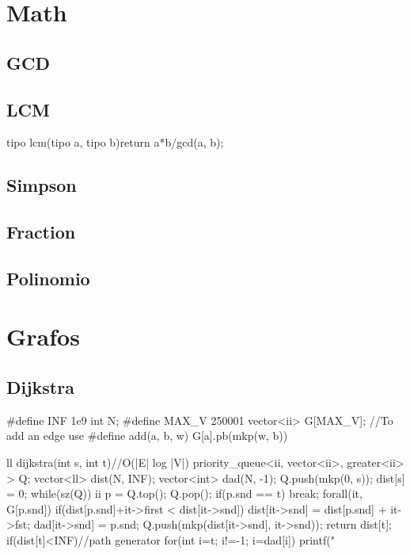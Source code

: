 \documentclass[10pt,landscape,twocolumn,a4paper,notitlepage]{article}
\newcommand\cppfile[2][]{

}
\begin{document}
\section{Math}
\subsection{GCD}
\subsection{LCM}
\begin{code}
tipo lcm(tipo a, tipo b){return a*b/gcd(a, b);}
\end{code}
\subsection{Simpson}
\cppfile{math/simpson}
\subsection{Fraction}
\cppfile{math/frac}
\subsection{Polinomio}
\cppfile{math/polinomio}
\section{Grafos}
\subsection{Dijkstra}
\begin{code}
#define INF 1e9
int N;
#define MAX_V 250001
vector<ii> G[MAX_V];
//To add an edge use
#define add(a, b, w) G[a].pb(mkp(w, b))

ll dijkstra(int s, int t){//O(|E| log |V|)
	priority_queue<ii, vector<ii>, greater<ii> > Q;
	vector<ll> dist(N, INF); vector<int> dad(N, -1);
	Q.push(mkp(0, s)); dist[s] = 0;
	while(sz(Q)){
		ii p = Q.top(); Q.pop();
		if(p.snd == t) break;
		forall(it, G[p.snd])
			if(dist[p.snd]+it->first < dist[it->snd]){
				dist[it->snd] = dist[p.snd] + it->fst;
				dad[it->snd] = p.snd;
				Q.push(mkp(dist[it->snd], it->snd));
			}
	}
	return dist[t];
	if(dist[t]<INF)//path generator
		for(int i=t; i!=-1; i=dad[i])
			printf("%
}
\end{code}
\end{document}
